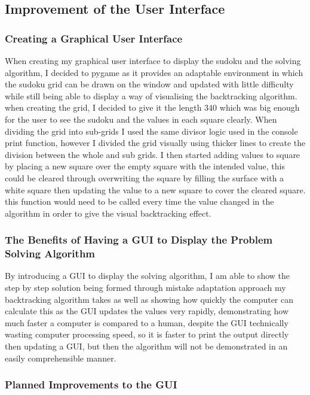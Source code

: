 \documentclass[]{final_report}
\begin{document}
\subsection*{Improvement of the User Interface}

\subsubsection{Creating a Graphical User Interface} 

When creating my graphical user interface to display the sudoku and the solving algorithm, I decided to pygame as it provides an adaptable environment in which the sudoku grid can be drawn on the window and updated with little difficulty while still being able to display a way of visualising the backtracking algorithm. when creating the grid, I decided to give it the length 340 which was big enough for the user to see the sudoku and the values in each square clearly. When dividing the grid into sub-grids I used the same divisor logic used in the console print function, however I divided the grid visually using thicker lines to create the division between the whole and sub grids. I then started adding values to square by placing a new square over the empty square with the intended value, this could be cleared through overwriting the square by filling the surface with a white square then updating the value to a new square to cover the cleared square. this function would need to be called every time the value changed in the algorithm in order to give the visual backtracking effect. 

\subsubsection{The Benefits of Having a GUI to Display the Problem Solving Algorithm} 

By introducing a GUI to display the solving algorithm, I am able to show the step by step solution being formed through mistake adaptation approach my backtracking algorithm takes as well as showing how quickly the computer can calculate this as the GUI updates the values very rapidly, demonstrating how much faster a computer is compared to a human, despite the GUI technically wasting computer processing speed, so it is faster to print the output directly then updating a GUI, but then the algorithm will not be demonstrated in an easily comprehensible manner. 

\subsubsection{Planned Improvements to the GUI} 
\end{document}

